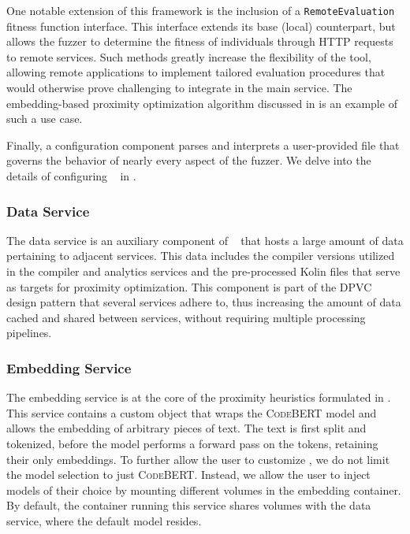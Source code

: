 One notable extension of this framework is the inclusion of a \texttt{RemoteEvaluation}
fitness function interface.
This interface extends its base (local) counterpart,
but allows the fuzzer to determine the fitness of individuals through HTTP requests
to remote services.
Such methods greatly increase the flexibility of the tool,
allowing remote applications to implement tailored evaluation procedures
that would otherwise prove challenging to integrate in the main service.
The embedding-based proximity optimization algorithm discussed in 
is an example of such a use case.

Finally, a configuration component parses and interprets a user-provided file
that governs the behavior of nearly every aspect of the fuzzer.
We delve into the details of configuring \kf~ in .

\subsubsection{Data Service}


The data service is an auxiliary component of \kf~ that hosts
a large amount of data pertaining to adjacent services.
This data includes the compiler versions utilized in the compiler
and analytics services and the pre-processed Kolin files
that serve as targets for proximity optimization.
This component is part of the \gls{DPVC} design pattern
that several services adhere to,
thus increasing the amount of data cached and shared between
services, without requiring multiple processing pipelines.

\subsubsection{Embedding Service}

The embedding service is at the core of the proximity heuristics
formulated in .
This service contains a custom object that wraps the
\textsc{CodeBERT} model and allows the embedding of arbitrary pieces of text.
The text is first split and tokenized,
before the model performs a forward pass 
on the tokens, retaining their only embeddings.
To further allow the user to customize \kf, we
do not limit the model selection to just \textsc{CodeBERT}.
Instead, we allow the user to inject models of their choice
by mounting different volumes in the embedding container.
By default, the container running this service
shares volumes with the data service, where the default
model resides.

